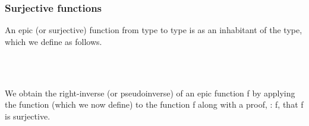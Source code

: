 \subsubsection{Surjective functions}\label{surjective-functions}
An epic (or surjective) function from type  to type  is as an inhabitant of the  type, which we define as follows.
\ccpad
\begin{code}%
\>[0][@{}l@{\AgdaIndent{1}}]%
\>[1]\AgdaSpace{}%
\AgdaSymbol{:}\AgdaSpace{}%
\AgdaSymbol{\{}\AgdaSpace{}%
\AgdaSymbol{:}\AgdaSpace{}%
\AgdaSpace{}%
\AgdaSpace{}%
\AgdaSymbol{\}}\AgdaSpace{}%
\AgdaSymbol{\{}\AgdaSpace{}%
\AgdaSymbol{:}\AgdaSpace{}%
\AgdaSpace{}%
\AgdaSpace{}%
\AgdaSymbol{\}}\AgdaSpace{}%
\AgdaSymbol{(}\AgdaSpace{}%
\AgdaSymbol{:}\AgdaSpace{}%
\AgdaSpace{}%
\AgdaSpace{}%
\AgdaSymbol{)}\AgdaSpace{}%
%
\>[45]\AgdaSpace{}%
\AgdaSpace{}%
\AgdaSpace{}%
\<%
\\
%
\>[1]\AgdaSpace{}%
\AgdaSpace{}%
\AgdaSymbol{=}\AgdaSpace{}%
\AgdaSpace{}%
\AgdaSpace{}%
\AgdaSpace{}%
\AgdaSpace{}%
\AgdaSpace{}%
\AgdaSpace{}%
\<%
\\
\>[0]\<%
\end{code}
\ccpad
We obtain the right-inverse (or pseudoinverse) of an epic function \af f by applying the function  (which we now define) to the function \af f along with a proof,  \as :  \ab f, that \af f is surjective.
\ccpad
\begin{code}%
\>[0][@{}l@{\AgdaIndent{1}}]%
\>[1]\AgdaSpace{}%
\AgdaSymbol{:}%
\>[233I]\AgdaSymbol{\{}\AgdaSpace{}%
\AgdaSymbol{:}\AgdaSpace{}%
\AgdaSpace{}%
\AgdaSpace{}%
\AgdaSymbol{\}}\AgdaSpace{}%
\AgdaSymbol{\{}\AgdaSpace{}%
\AgdaSymbol{:}\AgdaSpace{}%
\AgdaSpace{}%
\AgdaSpace{}%
\AgdaSymbol{\}}\<%
\\
\>[.][@{}l@{}]\<[233I]%
\>[11]\AgdaSymbol{(}\AgdaSpace{}%
\AgdaSymbol{:}\AgdaSpace{}%
\AgdaSpace{}%
\AgdaSpace{}%
\AgdaSymbol{)}\AgdaSpace{}%
\AgdaSpace{}%
\AgdaSpace{}%
\<%
\\
%
\>[11]\AgdaComment{-------------------------}\<%
\\
\>[1][@{}l@{\AgdaIndent{0}}]%
\>[2]%
\>[11]\AgdaSpace{}%
\AgdaSpace{}%
\<%
\\
%
\>[1]\AgdaSpace{}%
\AgdaSpace{}%
\AgdaSpace{}%
\AgdaSpace{}%
\AgdaSymbol{=}\AgdaSpace{}%
\AgdaSpace{}%
\AgdaSpace{}%
\AgdaSpace{}%
\AgdaSymbol{(}\AgdaSpace{}%
\AgdaSymbol{)}\<%
\end{code}

